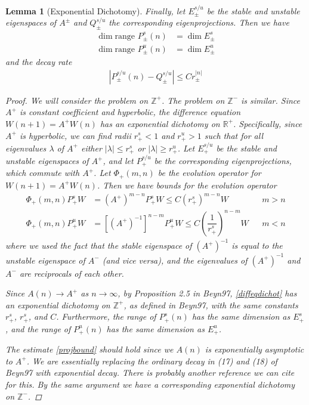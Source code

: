 \documentclass[12pt]{article}
\def\R{{\mathbb R}}
\def\Z{{\mathbb Z}}
\newtheorem{lemma}{Lemma}
\begin{document}
\begin{lemma}[Exponential Dichotomy]
Finally, let $E_\pm^{s/u}$ be the stable and unstable eigenspaces of $A^\pm$ and $Q_\pm^{s/u}$ the corresponding eigenprojections. Then we have
\begin{align*}
\dim \text{range }P_\pm^s(n) &= \dim E_\pm^s \\
\dim \text{range }P_\pm^u(n) &= \dim E_\pm^u
\end{align*}
and the decay rate
\begin{align}\label{projbound}
| P_\pm^{s/u}(n) - Q_\pm^{s/u} | \leq C r_\pm^{|n|}
\end{align}

\begin{proof}
We will consider the problem on $\Z^+$. The problem on $\Z^-$ is similar. Since $A^+$ is constant coefficient and hyperbolic, the difference equation $W(n+1) = A^+ W(n)$ has an exponential dichotomy on $\R^+$. Specifically, since $A^+$ is hyperbolic, we can find radii $r_+^s < 1$ and $r_+^u > 1$ such that for all eigenvalues $\lambda$ of $A^+$ either $|\lambda| \leq r_+^s$ or $|\lambda| \geq r_+^u$. Let $E_+^{s/u}$ be the stable and unstable eigenspaces of $A^+$, and let $P_+^{s/u}$ be the corresponding eigenprojections, which commute with $A^+$. Let $\Phi_+(m, n)$ be the evolution operator for $W(n+1) = A^+ W(n)$. Then we have bounds for the evolution operator
\begin{align*}
\Phi_+(m, n) P_+^s W &= (A^+)^{m-n} P_+^s W \leq C (r_+^s)^{m-n} W  && m > n \\
\Phi_+(m, n) P_+^u W &= [(A^+)^{-1}]^{n-m} P_+^u W \leq C \left( \dfrac{1}{r_+^s} \right)^{n-m} W && m < n
\end{align*}
where we used the fact that the stable eigenspace of $(A^+)^{-1}$ is equal to the unstable eigenspace of $A^-$ (and vice versa), and the eigenvalues of $(A^+)^{-1}$ and $A^-$ are reciprocals of each other.

Since $A(n) \rightarrow A^+$ as $n \rightarrow \infty$, by Proposition 2.5 in Beyn97, \eqref{diffeqdichot} has an exponential dichotomy on $\Z^+$, as defined in Beyn97, with the same constants $r_+^s$, $r_+^s$, and $C$. Furthermore, the range of $P_+^s(n)$ has the same dimension as $E_+^s$, and the range of $P_+^u(n)$ has the same dimension as $E_+^u$.

The estimate \eqref{projbound} should hold since we $A(n)$ is exponentially asymptotic to $A^+$. We are essentially replacing the ordinary decay in (17) and (18) of Beyn97 with exponential decay. There is probably another reference we can cite for this. By the same argument we have a corresponding exponential dichotomy on $\Z^-$.
\end{proof}
\end{lemma}
\end{document}
